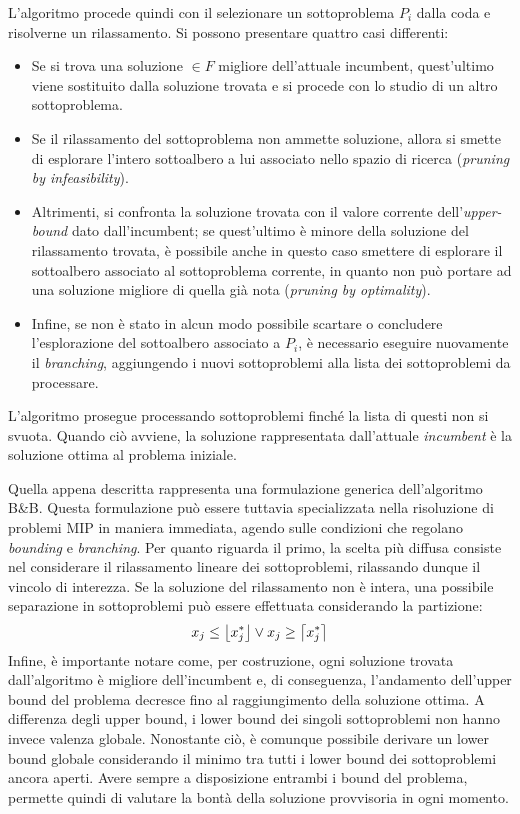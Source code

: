L'algoritmo procede quindi con il selezionare un sottoproblema $P_i$ dalla coda e risolverne un rilassamento. Si possono presentare quattro casi differenti:
\begin{itemize}
\itemsep-0.5em 
\item Se si trova una soluzione $\in F$ migliore dell'attuale incumbent, quest'ultimo viene 
sostituito dalla soluzione trovata e si procede con lo studio di un altro sottoproblema.
\item Se il rilassamento del sottoproblema non ammette soluzione, allora si smette di esplorare l'intero sottoalbero a lui associato 
nello spazio di ricerca (\textit{pruning by infeasibility}).
\item Altrimenti, si confronta la soluzione trovata con il valore corrente dell'\textit{upper-bound} dato dall'incumbent; se
quest'ultimo è minore della soluzione del rilassamento trovata, è possibile anche in questo caso smettere di esplorare il sottoalbero associato al
sottoproblema corrente, in quanto non può portare ad una soluzione migliore di quella già nota (\textit{pruning by optimality}).
\item Infine, se non è stato in alcun modo possibile scartare o concludere l'esplorazione del sottoalbero associato a $P_i$, è necessario
eseguire nuovamente il \textit{branching}, aggiungendo i nuovi sottoproblemi alla lista dei sottoproblemi da processare.
\end{itemize}
L'algoritmo prosegue processando sottoproblemi finché la lista di questi non si svuota. Quando ciò avviene, la soluzione
rappresentata dall'attuale \textit{incumbent} è la soluzione ottima al problema iniziale.

Quella appena descritta rappresenta una formulazione generica dell'algoritmo B\&B. Questa formulazione può essere
tuttavia specializzata nella risoluzione di problemi MIP in maniera immediata, agendo sulle condizioni che regolano 
\textit{bounding} e \textit{branching}. Per quanto riguarda il primo, la scelta più diffusa consiste nel considerare
il rilassamento lineare dei sottoproblemi, rilassando dunque il vincolo di interezza.
Se la soluzione del rilassamento non è intera, una possibile separazione in sottoproblemi può essere effettuata considerando la partizione:
\begin{align*}
x_j \leq \floor*{x_j^*} \vee x_j \geq \ceil*{x_j^*}
\end{align*}
\indent
Infine, è importante notare come, per costruzione, ogni soluzione trovata dall'algoritmo è migliore dell'incumbent e, di conseguenza, 
l'andamento dell'upper bound del problema decresce fino al raggiungimento della soluzione ottima. A differenza degli upper bound, i lower bound 
dei singoli sottoproblemi non hanno invece valenza globale. Nonostante ciò, è comunque possibile derivare un lower bound globale considerando il minimo 
tra tutti i lower bound dei sottoproblemi ancora aperti. Avere sempre a disposizione entrambi i bound del problema, 
permette quindi di valutare la bontà della soluzione provvisoria in ogni momento. 

